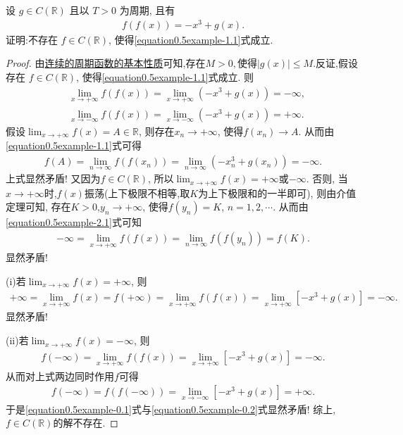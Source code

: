 \documentclass[../../main.tex]{subfiles}
\begin{document}
\begin{example}
设 \(g\in C(\mathbb{R})\) 且以 \(T > 0\) 为周期, 且有
\begin{align}
f(f(x))=-x^3 + g(x).\label{equation0.5example-1.1}
\end{align}
证明:不存在 \(f\in C(\mathbb{R})\), 使得\eqref{equation0.5example-1.1}式成立. 
\end{example}
\begin{proof}
由\hyperref[proposition:连续的周期函数的基本性质]{连续的周期函数的基本性质}可知,存在$M>0,$使得$|g(x)|\leqslant M.$反证,假设存在 \(f\in C(\mathbb{R})\), 使得\eqref{equation0.5example-1.1}式成立. 则
\begin{align}
&\underset{x\rightarrow +\infty}{\lim}f\left( f\left( x \right) \right) =\underset{x\rightarrow +\infty}{\lim}\left( -x^3+g\left( x \right) \right) =-\infty ,\label{equation0.5example-2.1}
\\
&\underset{x\rightarrow -\infty}{\lim}f\left( f\left( x \right) \right) =\underset{x\rightarrow -\infty}{\lim}\left( -x^3+g\left( x \right) \right) =+\infty .\label{equation0.5example-2.2}
\end{align}
假设\(\lim_{x\rightarrow +\infty}f(x) = A\in \mathbb{R}\), 则存在\(x_n\rightarrow +\infty\), 使得\(f(x_n)\rightarrow A\). 从而由\eqref{equation0.5example-1.1}式可得
\begin{align*}
f(A) = \lim_{n\rightarrow \infty}f(f(x_n)) = \lim_{n\rightarrow \infty}(-x_{n}^{3}+g(x_n)) = -\infty.
\end{align*}
上式显然矛盾! 又因为\(f\in C(\mathbb{R})\), 所以\(\lim_{x\rightarrow +\infty}f(x) = +\infty\)或\(-\infty\).
否则, 当\(x\rightarrow +\infty\)时,\(f(x)\)振荡(上下极限不相等,取$K$为上下极限和的一半即可), 则由介值定理可知, 存在$K>0$,\(y_n\rightarrow +\infty\), 使得\(f(y_n) = K\), \(n = 1,2,\cdots\).
从而由\eqref{equation0.5example-2.1}式可知
\begin{align*}
-\infty = \lim_{x\rightarrow +\infty}f(f(x)) = \lim_{n\rightarrow \infty}f(f(y_n)) = f(K).
\end{align*}
显然矛盾!

(i)若\(\lim_{x\rightarrow +\infty}f(x) = +\infty\), 则
\begin{align*}
+\infty = \lim_{x\rightarrow +\infty}f(x) = f(+\infty) = \lim_{x\rightarrow +\infty}f(f(x)) = \lim_{x\rightarrow +\infty}[-x^3 + g(x)] = -\infty.
\end{align*}
显然矛盾!

(ii)若\(\lim_{x\rightarrow +\infty}f(x) = -\infty\), 则
\begin{align}
f(-\infty) = \lim_{x\rightarrow +\infty}f(f(x)) = \lim_{x\rightarrow +\infty}[-x^3 + g(x)] = -\infty. \label{equation0.5example-0.1}
\end{align}
从而对上式两边同时作用\(f\)可得
\begin{align}
f(-\infty) = f(f(-\infty)) = \lim_{x\rightarrow -\infty}[-x^3 + g(x)] = +\infty. \label{equation0.5example-0.2}
\end{align}
于是\eqref{equation0.5example-0.1}式与\eqref{equation0.5example-0.2}式显然矛盾!
综上,\(f\in C(\mathbb{R})\)的解不存在. 

\end{proof}
\end{document}
